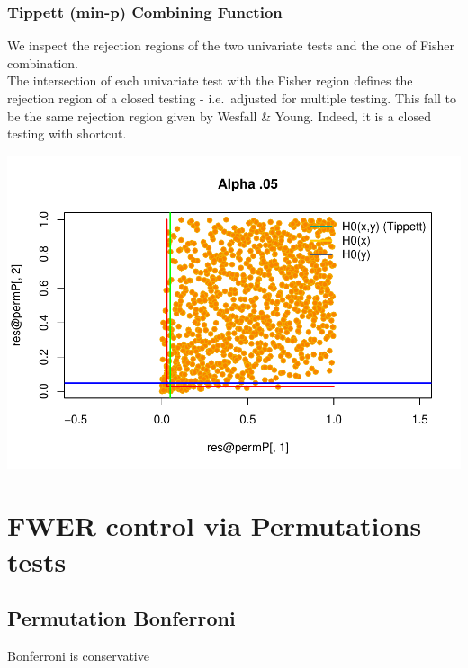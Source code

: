 \documentclass[
]{article}
\begin{document}
\hypertarget{tippett-min-p-combining-function}{%
\subsubsection{Tippett (min-p) Combining
Function}\label{tippett-min-p-combining-function}}

We inspect the rejection regions of the two univariate tests and the one
of Fisher combination.\\
The intersection of each univariate test with the Fisher region defines
the rejection region of a closed testing - i.e.~adjusted for multiple
testing. This fall to be the same rejection region given by Wesfall \&
Young. Indeed, it is a closed testing with shortcut.

\begin{center}\includegraphics{perm_files/figure-latex/unnamed-chunk-38-1} \end{center}

\hypertarget{fwer-control-via-permutations-tests}{%
\section{FWER control via Permutations
tests}\label{fwer-control-via-permutations-tests}}

\hypertarget{permutation-bonferroni}{%
\subsection{Permutation Bonferroni}\label{permutation-bonferroni}}

Bonferroni is conservative
\end{document}
